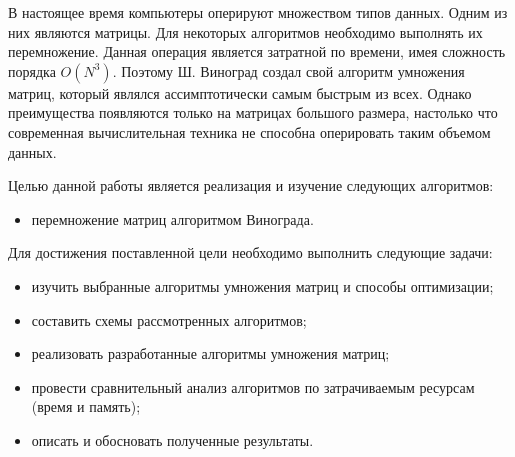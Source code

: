 \setcounter{page}{4}

В настоящее время компьютеры оперируют множеством типов данных. Одним из них являются матрицы. Для некоторых алгоритмов необходимо выполнять их перемножение. Данная операция является затратной по времени, имея сложность порядка $O(N^3)$. Поэтому Ш. Виноград создал свой алгоритм умножения матриц, который являлся ассимптотически самым быстрым из всех. Однако преимущества появляются только на матрицах большого размера, настолько что современная вычислительная техника не способна оперировать таким объемом данных.

Целью данной работы является реализация и изучение следующих алгоритмов:

\begin{itemize}
    \item перемножение матриц алгоритмом Винограда.
\end{itemize}

Для достижения поставленной цели необходимо выполнить следующие задачи:
\begin{itemize}
	\item изучить выбранные алгоритмы умножения матриц и способы оптимизации;
	\item составить схемы рассмотренных алгоритмов;
	\item реализовать разработанные алгоритмы умножения матриц;
	\item провести сравнительный анализ алгоритмов по затрачиваемым ресурсам (время и память);
	\item описать и обосновать полученные результаты.
\end{itemize}